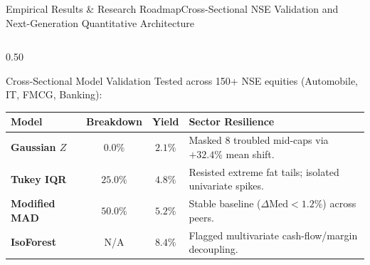 \begin{frame}{Empirical Results \& Research Roadmap}{Cross-Sectional NSE Validation and Next-Generation Quantitative Architecture}
    \vspace{-0.20cm}
    \begin{columns}[T,onlytextwidth]
        \begin{column}{0.50\textwidth}
            \begin{quantcard}[height=5.60cm]{Cross-Sectional Model Validation}
                \fontsize{5.2pt}{6.4pt}\selectfont
                Tested across 150+ NSE equities (Automobile, IT, FMCG, Banking):
                \vspace{2pt}

                \renewcommand{\arraystretch}{0.98}
                \begin{tabularx}{\linewidth}{>{\bfseries}l c c >{\raggedright\arraybackslash}X}
                    \toprule
                    \textbf{\color{deepemerald}Model} & \textbf{\color{deepemerald}Breakdown} & \textbf{\color{deepemerald}Yield} & \textbf{\color{deepemerald}Sector Resilience} \\
                    \midrule
                    Gaussian $Z$ & $0.0\%$ & $2.1\%$ & Masked 8 troubled mid-caps via $+32.4\%$ mean shift. \\
                    \rowcolor{cardinner}
                    Tukey IQR & $25.0\%$ & $4.8\%$ & Resisted extreme fat tails; isolated univariate spikes. \\
                    Modified MAD & $50.0\%$ & $5.2\%$ & Stable baseline ($\Delta \text{Med} < 1.2\%$) across peers. \\
                    \rowcolor{cardinner}
                    IsoForest & N/A & $8.4\%$ & Flagged multivariate cash-flow/margin decoupling. \\
                    \bottomrule
                \end{tabularx}


\end{quantcard}
\end{column}
\end{columns}
\end{frame}
